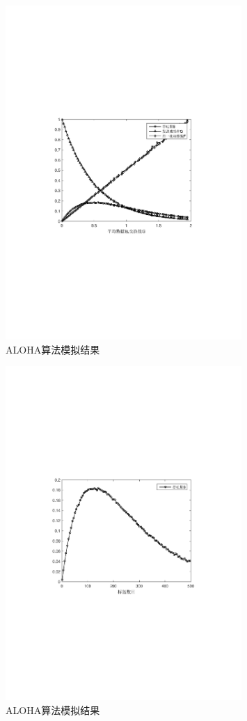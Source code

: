 \documentclass[a4paper]{ctexart}
\begin{document}
\begin{figure}[htbp]
	\centering
	\includegraphics[width=0.8\textwidth]{figure/1.pdf}
	\caption{ALOHA算法模拟结果}\label{fig:1}
\end{figure}
\begin{figure}[htbp]
	\centering
	\includegraphics[width=0.8\textwidth]{figure/2.pdf}
	\caption{ALOHA算法模拟结果}\label{fig:2}
\end{figure}
\end{document}
